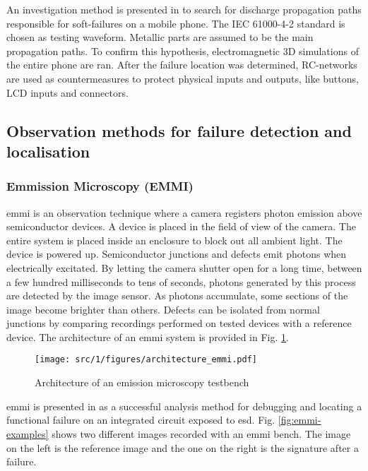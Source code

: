 An investigation method is presented in \cite{softFailMobile} to search for discharge propagation paths responsible for soft-failures on a mobile phone.
The IEC 61000-4-2 standard is chosen as testing waveform.
Metallic parts are assumed to be the main propagation paths.
To confirm this hypothesis, electromagnetic 3D simulations of the entire phone are ran.
After the failure location was determined, RC-networks are used as countermeasures to protect physical inputs and outputs, like buttons, LCD inputs and connectors.

\subsection{Observation methods for failure detection and localisation}

\subsubsection{Emmission Microscopy (EMMI)}

\gls{emmi} is an observation technique where a camera registers photon emission above semiconductor devices.
A device is placed in the field of view of the camera.
The entire system is placed inside an enclosure to block out all ambient light.
The device is powered up.
Semiconductor junctions and defects emit photons when electrically excitated.
By letting the camera shutter open for a long time, between a few hundred milliseconds to tens of seconds, photons generated by this process are detected by the image sensor.
As photons accumulate, some sections of the image become brighter than others.
Defects can be isolated from normal junctions by comparing recordings performed on tested devices with a reference device.
The architecture of an \gls{emmi} system is provided in Fig. \ref{fig:emmi}.

\begin{figure}[!h]
  \centering
  \texttt{[image: src/1/figures/architecture\_emmi.pdf]}
  \caption{Architecture of an emission microscopy testbench}
  \label{fig:emmi}
\end{figure}

\gls{emmi} is presented in \cite{softfailEMMI} as a successful analysis method for debugging and locating a functional failure on an integrated circuit exposed to \gls{esd}.
Fig. \ref{fig:emmi-examples} shows two different images recorded with an \gls{emmi} bench.
The image on the left is the reference image and the one on the right is the signature after a failure.

